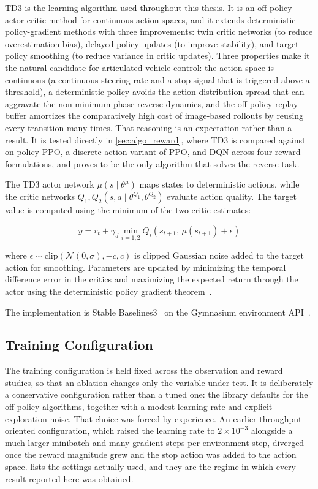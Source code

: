 TD3 is the learning algorithm used throughout this thesis. It is an off-policy actor-critic method for continuous action spaces, and it extends deterministic policy-gradient methods with three improvements: twin critic networks (to reduce overestimation bias), delayed policy updates (to improve stability), and target policy smoothing (to reduce variance in critic updates). Three properties make it the natural candidate for articulated-vehicle control: the action space is continuous (a continuous steering rate and a stop signal that is triggered above a threshold), a deterministic policy avoids the action-distribution spread that can aggravate the non-minimum-phase reverse dynamics, and the off-policy replay buffer amortizes the comparatively high cost of image-based rollouts by reusing every transition many times. That reasoning is an expectation rather than a result. It is tested directly in \cref{sec:algo_reward}, where TD3 is compared against on-policy PPO, a discrete-action variant of PPO, and DQN across four reward formulations, and proves to be the only algorithm that solves the reverse task.

The TD3 actor network $\mu(s \mid \theta^\mu)$ maps states to deterministic actions, while the critic networks $Q_1, Q_2(s, a \mid \theta^{Q_1}, \theta^{Q_2})$ evaluate action quality. The target value is computed using the minimum of the two critic estimates:

\begin{equation}
    y = r_t + \gamma_d \min_{i=1,2} Q_i(s_{t+1},\, \mu(s_{t+1}) + \epsilon)
    \label{eq:td3_target}
\end{equation}

where $\epsilon \sim \text{clip}(\mathcal{N}(0, \sigma), -c, c)$ is clipped Gaussian noise added to the target action for smoothing. Parameters are updated by minimizing the temporal difference error in the critics and maximizing the expected return through the actor using the deterministic policy gradient theorem~\cite{silver2014dpg}.

The implementation is Stable Baselines3~\cite{raffin2021sb3} on the Gymnasium environment API~\cite{towers2024gymnasium}.

\subsection{Training Configuration}
\label{sec:hpo}

The training configuration is held fixed across the observation and reward studies, so that an ablation changes only the variable under test. It is deliberately a conservative configuration rather than a tuned one: the library defaults for the off-policy algorithms, together with a modest learning rate and explicit exploration noise. That choice was forced by experience. An earlier throughput-oriented configuration, which raised the learning rate to $2\times10^{-3}$ alongside a much larger minibatch and many gradient steps per environment step, diverged once the reward magnitude grew and the stop action was added to the action space.  lists the settings actually used, and they are the regime in which every result reported here was obtained.

